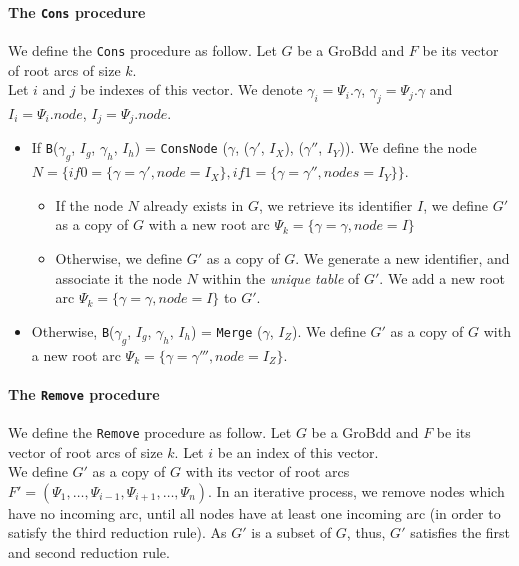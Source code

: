 \documentclass[a4paper,10pt]{article}
\begin{document}
\paragraph{The \texttt{Cons} procedure\\}
We define the \texttt{Cons} procedure as follow.
Let $G$ be a GroBdd and $F$ be its vector of root arcs of size $k$.\\
Let $i$ and $j$ be indexes of this vector.
We denote $\gamma_i = \Psi_i.\gamma$, $\gamma_j = \Psi_j.\gamma$ and $I_i = \Psi_i.node$, $I_j = \Psi_j.node$.
\begin{itemize}
\item If \texttt{B}($\gamma_g$, $I_g$, $\gamma_h$, $I_h$) = \texttt{ConsNode} ($\gamma$, ($\gamma'$, $I_X$), ($\gamma''$, $I_Y$)). We define the node $N = \{if0 = \{\gamma = \gamma', node = I_X\}, if1 = \{\gamma = \gamma'', nodes = I_Y\}\}$.\begin{itemize}
\item If the node $N$ already exists in $G$, we retrieve its identifier $I$, we define $G'$ as a copy of $G$ with a new root arc $\Psi_k = \{\gamma = \gamma, node = I\}$
\item Otherwise, we define $G'$ as a copy of $G$.
We generate a new identifier, and associate it the node $N$ within the \textit{unique table} of $G'$.
We add a new root arc $\Psi_k = \{\gamma = \gamma, node = I\}$ to $G'$.
\end{itemize}
\item Otherwise, \texttt{B}($\gamma_g$, $I_g$, $\gamma_h$, $I_h$) = \texttt{Merge} ($\gamma$, $I_Z$). We define $G'$ as a copy of $G$ with a new root arc $\Psi_k = \{\gamma = \gamma''', node = I_Z\}$.
\end{itemize}

\paragraph{The \texttt{Remove} procedure\\}
We define the \texttt{Remove} procedure as follow.
Let $G$ be a GroBdd and $F$ be its vector of root arcs of size $k$.
Let $i$ be an index of this vector.\\
We define $G'$ as a copy of $G$ with its vector of root arcs $F' = (\Psi_1, \dots, \Psi_{i-1}, \Psi_{i+1}, \dots, \Psi_n)$.
In an iterative process, we remove nodes which have no incoming arc, until all nodes have at least one incoming arc (in order to satisfy the third reduction rule).
As $G'$ is a subset of $G$, thus, $G'$ satisfies the first and second reduction rule.
\end{document}
